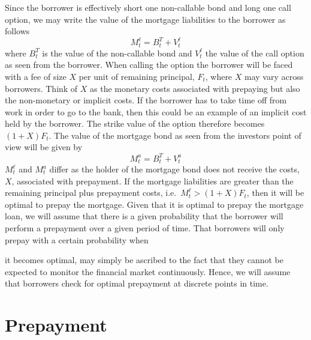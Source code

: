 \documentclass[12pt,twoside]{reedthesis}
\begin{document}
Since the borrower is effectively short one non-callable bond and long one call option, we may write the value of the mortgage liabilities to the borrower as follows
\[
M_{t}^{\ell}=B_{t}^{T}+V_{t}^{\ell}
\]
where \(B_{t}^{T}\) is the value of the non-callable bond and \(V_{t}^{\ell}\) the value of the call option as seen from the borrower. When calling the option the borrower will be faced with a fee of size \(X\) per unit of remaining principal, \(F_{t}\), where \(X\) may vary across borrowers. Think of \(X\) as the monetary costs associated with prepaying but also the non-monetary or implicit costs. If the borrower has to take time off from work in order to go to the bank, then this could be an example of an implicit cost held by the borrower. The strike value of the option therefore becomes \((1+X) F_{t}\). The value of the mortgage bond as seen from the investors point of view will be given by
\[
M_{t}^{a}=B_{t}^{T}+V_{t}^{a}
\]
\(M_{t}^{\ell}\) and \(M_{t}^{a}\) differ as the holder of the mortgage bond does not receive the costs, \(X\), associated with prepayment. If the mortgage liabilities are greater than the remaining principal plus prepayment costs, i.e.~\(M_{t}^{\ell}>(1+X) F_{t}\), then it will be optimal to prepay the mortgage. Given that it is optimal to prepay the mortgage loan, we will assume that there is a given probability that the borrower will perform a prepayment over a given period of time. That borrowers will only prepay with a certain probability when

it becomes optimal, may simply be ascribed to the fact that they cannot be expected to monitor the financial market continuously. Hence, we will assume that borrowers check for optimal prepayment at discrete points in time.

\hypertarget{prepayment-1}{%
\section{Prepayment}\label{prepayment-1}}
\end{document}

